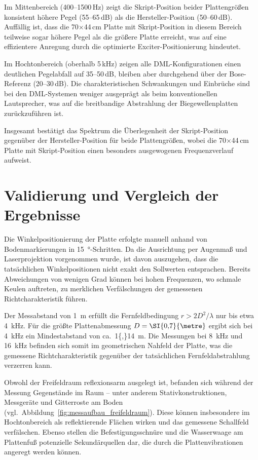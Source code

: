 Im Mittenbereich (400--1500\,Hz) zeigt die Skript-Position beider Plattengrößen konsistent höhere Pegel (55--65\,dB) als die Hersteller-Position (50--60\,dB). Auffällig ist, dass die 70$\times$44\,cm Platte mit Skript-Position in diesem Bereich teilweise sogar höhere Pegel als die größere Platte erreicht, was auf eine effizientere Anregung durch die optimierte Exciter-Positionierung hindeutet.

Im Hochtonbereich (oberhalb 5\,kHz) zeigen alle DML-Konfigurationen einen deutlichen Pegelabfall auf 35--50\,dB, bleiben aber durchgehend über der Bose-Referenz (20--30\,dB). Die charakteristischen Schwankungen und Einbrüche sind bei den DML-Systemen weniger ausgeprägt als beim konventionellen Lautsprecher, was auf die breitbandige Abstrahlung der Biegewellenplatten zurückzuführen ist.

Insgesamt bestätigt das Spektrum die Überlegenheit der Skript-Position gegenüber der Hersteller-Position für beide Plattengrößen, wobei die 70$\times$44\,cm Platte mit Skript-Position einen besonders ausgewogenen Frequenzverlauf aufweist.


\clearpage

\section{Validierung und Vergleich der Ergebnisse}


Die Winkelpositionierung der Platte erfolgte manuell anhand von Bodenmarkierungen in \SI{15}{\degree}-Schritten. Da die Ausrichtung per Augenmaß und Laserprojektion vorgenommen wurde, ist davon auszugehen, dass die tatsächlichen Winkelpositionen nicht exakt den Sollwerten entsprachen. Bereits Abweichungen von wenigen Grad können bei hohen Frequenzen, wo schmale Keulen auftreten, zu merklichen Verfälschungen der gemessenen Richtcharakteristik führen.
 
Der Messabstand von \SI{1}{\metre} erfüllt die Fernfeldbedingung $r > 2D^2/\lambda$ nur bis etwa \SI{4}{\kilo\hertz}. Für die größte Plattenabmessung $D = \SI{0{,}7}{\metre}$ ergibt sich bei \SI{4}{\kilo\hertz} ein Mindestabstand von ca.\ \SI{1{,}14}{\metre}. Die Messungen bei \SI{8}{\kilo\hertz} und \SI{16}{\kilo\hertz} befinden sich somit im geometrischen Nahfeld der Platte, was die gemessene Richtcharakteristik gegenüber der tatsächlichen Fernfeldabstrahlung verzerren kann.
 
Obwohl der Freifeldraum reflexionsarm ausgelegt ist, befanden sich während der Messung Gegenstände im Raum -- unter anderem Stativkonstruktionen, Messgeräte und Gitterroste am Boden (vgl.\ Abbildung~\ref{fig:messaufbau_freifeldraum}). Diese können insbesondere im Hochtonbereich als reflektierende Flächen wirken und das gemessene Schallfeld verfälschen. Ebenso stellen die Befestigungsschnüre und die Wasserwaage am Plattenfuß potenzielle Sekundärquellen dar, die durch die Plattenvibrationen angeregt werden können.
 
